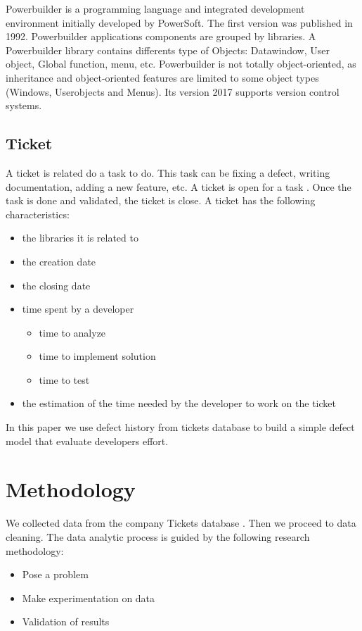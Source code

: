 \documentclass[10pt,conference]{IEEEtran}
\begin{document}
Powerbuilder is a programming language and integrated development environment initially developed by PowerSoft. The first version was published in 1992.
Powerbuilder applications components are grouped by libraries.  
A Powerbuilder library contains differents type of Objects: Datawindow, User object, Global function,  menu, etc. 
Powerbuilder is not totally object-oriented, as inheritance and object-oriented features are limited to some object types (Windows, Userobjects and Menus). 
Its version 2017 supports version control systems.%
    

\subsection{Ticket}

A ticket is related do a task to do. 
This task can be fixing a defect, writing documentation, adding a new feature, etc. 
A ticket is open for a task . 
Once the task is done and validated, the ticket is close.
A ticket has the following characteristics:

\begin{itemize}
\item the libraries it  is related to
\item the creation date
\item the closing date
\item time spent by a developer
  \begin{itemize}
\item time to analyze
\item time to implement solution
\item time to test
  \end{itemize}
\item  the estimation of the time needed by the developer to work on the ticket
\end{itemize}
In this paper we use defect history  from tickets database to build a simple defect model that evaluate developers effort.

\section{Methodology}
\label{sec:methodology}

We collected data  from the company Tickets database .  
Then we proceed to data cleaning.
The data analytic process is guided by the following research methodology:
\begin{itemize}
\item Pose a problem
\item Make experimentation on data
\item Validation of results
\end{itemize}
\end{document}
